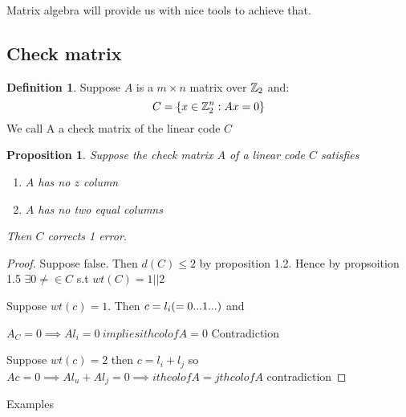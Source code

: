\documentclass[]{article}
\newtheorem{prop}[thm]{Proposition}
\theoremstyle{definition}
\newtheorem*{defn}{Definition}
\theoremstyle{remark}
\numberwithin{equation}{section}
\begin{document}
		Matrix algebra will provide us with nice tools to achieve that.
	\subsection{Check matrix}

		\begin{defn}
		Suppose \(A\) is a \(m \times n\) matrix over \(\mathbb{Z}_2\) and:
		\begin{equation*}
		C = \{ x \in \mathbb{Z}_2^n : Ax = 0\}
		\end{equation*}
		We call A a check matrix of the linear code $C$
		\end{defn}

		\begin{prop}
		Suppose the check matrix $A$ of a linear code $C$ satisfies

		\begin{enumerate}
			\item $A$ has no $z$ column
			\item $A$ has no two equal columns
		\end{enumerate}
		Then $C$ corrects 1 error.
		\end{prop}

		\begin{proof}
		Suppose false. Then $d(C) \leq 2$ by proposition 1.2.
		Hence by propsoition 1.5 $\exists 0\neq \in C$ s.t $wt(C) = 1 || 2$

		Suppose $wt(c) = 1$. Then $c = l_i \space(=0 ... 1 ...)$ and 

		$A_C = 0 \implies Al_i = 0 \ implies ith col of A = 0$ Contradiction

		Suppose $wt(c) = 2$ then $c = l_i + l_j$ so 
		$Ac = 0 \implies Al_u + Al_j = 0 \implies ith col of A = jth col of A$ contradiction
		\end{proof}

		Examples
\end{document}

